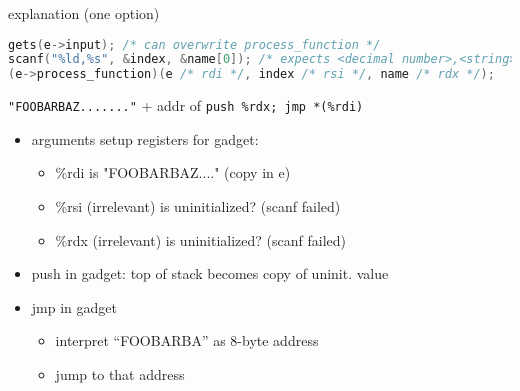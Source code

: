 \begin{soln}
\begin{frame}[fragile,label=useFPtrOverwrite1Explain]{explanation (one option)}
\begin{lstlisting}[language=C++,style=script]
gets(e->input); /* can overwrite process_function */
scanf("%ld,%s", &index, &name[0]); /* expects <decimal number>,<string> */
(e->process_function)(e /* rdi */, index /* rsi */, name /* rdx */);
\end{lstlisting}
\texttt{"FOOBARBAZ......."} + addr of \texttt{push \%rdx; jmp *(\%rdi)}
\begin{itemize}
\item arguments setup registers for gadget:
\begin{itemize}
    \item \%rdi is "FOOBARBAZ...." (copy in e)
    \item \%rsi (irrelevant) is uninitialized? (scanf failed)
    \item \%rdx (irrelevant) is uninitialized? (scanf failed)
\end{itemize}
\item push in gadget: top of stack becomes copy of uninit. value 
\item jmp in gadget
    \begin{itemize}
    \item interpret ``FOOBARBA'' as 8-byte address
    \item jump to that address
    \end{itemize}
\end{itemize}
\end{frame}


\end{soln}
